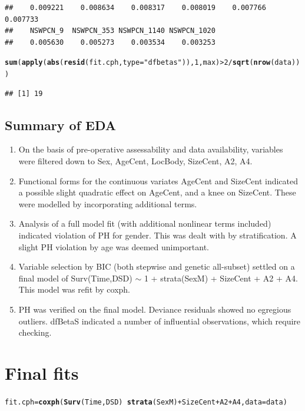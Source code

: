 \documentclass{article}\usepackage[]{graphicx}\usepackage[]{color}
\makeatletter
\newcommand{\hlnum}[1]{\textcolor[rgb]{0.686,0.059,0.569}{#1}}%
\newcommand{\hlstr}[1]{\textcolor[rgb]{0.192,0.494,0.8}{#1}}%
\newcommand{\hlopt}[1]{\textcolor[rgb]{0,0,0}{#1}}%
\newcommand{\hlstd}[1]{\textcolor[rgb]{0.345,0.345,0.345}{#1}}%
\newcommand{\hlkwb}[1]{\textcolor[rgb]{0.69,0.353,0.396}{#1}}%
\newcommand{\hlkwc}[1]{\textcolor[rgb]{0.333,0.667,0.333}{#1}}%
\newcommand{\hlkwd}[1]{\textcolor[rgb]{0.737,0.353,0.396}{\textbf{#1}}}%
\newenvironment{kframe}{%
 \def\at@end@of@kframe{}%
 \ifinner\ifhmode%
  \def\at@end@of@kframe{\end{minipage}}%
  \begin{minipage}{\columnwidth}%
 \fi\fi%
 \def\FrameCommand##1{\hskip\@totalleftmargin \hskip-\fboxsep
 \colorbox{shadecolor}{##1}\hskip-\fboxsep
     \hskip-\linewidth \hskip-\@totalleftmargin \hskip\columnwidth}%
 \MakeFramed {\advance\hsize-\width
   \@totalleftmargin\z@ \linewidth\hsize
   \@setminipage}}%
 {\par\unskip\endMakeFramed%
 \at@end@of@kframe}
\newenvironment{knitrout}{}{} %
\makeatother
\begin{document}
\begin{knitrout}
\begin{kframe}
\begin{verbatim}
##    0.009221    0.008634    0.008317    0.008019    0.007766    0.007733 
##    NSWPCN_9  NSWPCN_353 NSWPCN_1140 NSWPCN_1020 
##    0.005630    0.005273    0.003534    0.003253
\end{verbatim}
\begin{alltt}
\hlkwd{sum}\hlstd{(}\hlkwd{apply}\hlstd{(}\hlkwd{abs}\hlstd{(}\hlkwd{resid}\hlstd{(fit.cph,} \hlkwc{type} \hlstd{=} \hlstr{"dfbetas"}\hlstd{)),} \hlnum{1}\hlstd{, max)} \hlopt{>} \hlnum{2}\hlopt{/}\hlkwd{sqrt}\hlstd{(}\hlkwd{nrow}\hlstd{(data)))}
\end{alltt}
\begin{verbatim}
## [1] 19
\end{verbatim}
\end{kframe}
\end{knitrout}

\subsection{Summary of EDA}
\begin{enumerate}
\item On the basis of pre-operative assessability and data availability, variables were filtered down to Sex, AgeCent, LocBody, SizeCent, A2, A4.
\item Functional forms for the continuous variates AgeCent and SizeCent indicated a possible slight quadratic effect on AgeCent, and a knee on SizeCent.  These were modelled by incorporating additional terms.
\item Analysis of a full model fit (with additional nonlinear terms included) indicated violation of PH for gender.  This was dealt with by stratification.  A slight PH violation by age was deemed unimportant. 
\item Variable selection by BIC (both stepwise and genetic all-subset) settled on a final model of Surv(Time,DSD) $\sim$ 1 + strata(SexM) + SizeCent + A2 + A4.  This model was refit by coxph. 
\item PH was verified on the final model.  Deviance residuals showed no egregious outliers. dfBetaS indicated a number of influential observations, which require checking.
\end{enumerate}

\section{Final fits}
\begin{knitrout}
\color{fgcolor}\begin{kframe}
\begin{alltt}
\hlstd{fit.cph} \hlkwb{=} \hlkwd{coxph}\hlstd{(}\hlkwd{Surv}\hlstd{(Time, DSD)} \hlopt{~} \hlkwd{strata}\hlstd{(SexM)} \hlopt{+} \hlstd{SizeCent} \hlopt{+} \hlstd{A2} \hlopt{+} \hlstd{A4,} \hlkwc{data} \hlstd{= data)}
\end{alltt}
\end{kframe}
\end{knitrout}
\end{document}
